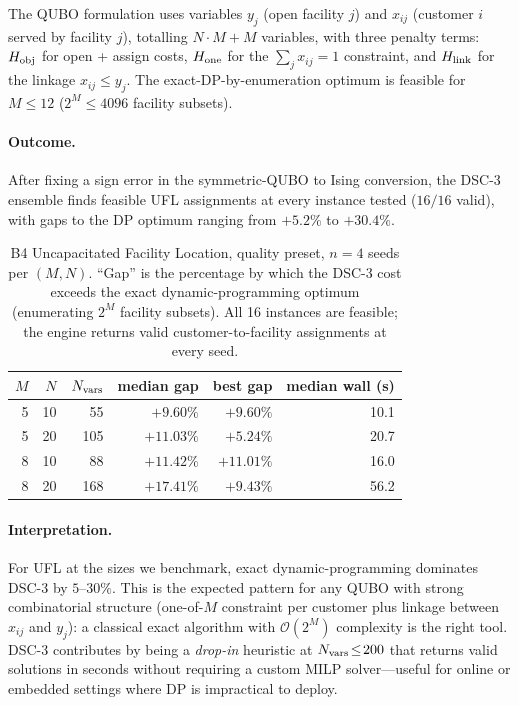 \documentclass[11pt,a4paper]{article}
\begin{document}
The QUBO formulation uses variables $y_j$ (open facility $j$) and
$x_{ij}$ (customer $i$ served by facility $j$), totalling $N\!\cdot\!M + M$
variables, with three penalty terms:
$H_{\rm obj}$ for open + assign costs, $H_{\rm one}$ for the
$\sum_j x_{ij}\!=\!1$ constraint, and $H_{\rm link}$ for the linkage
$x_{ij}\!\le\!y_j$. The exact-DP-by-enumeration optimum is feasible
for $M\!\le\!12$ ($2^M\!\le\!4096$ facility subsets).

\paragraph{Outcome.} After fixing a sign error in the symmetric-QUBO
to Ising conversion, the DSC-3 ensemble finds feasible UFL assignments
at every instance tested ($16/16$ valid), with gaps to the DP optimum
ranging from $+5.2\%$ to $+30.4\%$.

\begin{table}[h]
\centering
\caption{B4 Uncapacitated Facility Location, quality preset, $n=4$
seeds per $(M, N)$. ``Gap'' is the percentage by which the DSC-3 cost
exceeds the exact dynamic-programming optimum (enumerating $2^M$
facility subsets). All 16 instances are feasible; the engine returns
valid customer-to-facility assignments at every seed.}
\label{tab:b4_facility_results}
\small
\begin{tabular}{rrrrrr}
\toprule
$M$ & $N$ & $N_{\rm vars}$ & median gap & best gap & median wall (s) \\
\midrule
5 & 10 & 55  & $+9.60\%$  & $+9.60\%$  & 10.1 \\
5 & 20 & 105 & $+11.03\%$ & $+5.24\%$  & 20.7 \\
8 & 10 & 88  & $+11.42\%$ & $+11.01\%$ & 16.0 \\
8 & 20 & 168 & $+17.41\%$ & $+9.43\%$  & 56.2 \\
\bottomrule
\end{tabular}
\end{table}

\paragraph{Interpretation.} For UFL at the sizes we benchmark, exact
dynamic-programming dominates DSC-3 by $5$--$30\%$. This is the
expected pattern for any QUBO with strong combinatorial structure
(one-of-$M$ constraint per customer plus linkage between $x_{ij}$ and
$y_j$): a classical exact algorithm with $\mathcal{O}(2^M)$ complexity
is the right tool. DSC-3 contributes by being a \emph{drop-in}
heuristic at $N_{\rm vars}\!\le\!200$ that returns valid solutions in
seconds without requiring a custom MILP solver---useful for online or
embedded settings where DP is impractical to deploy.
\end{document}
